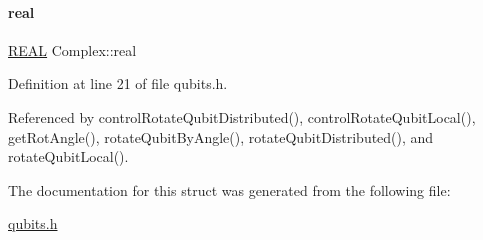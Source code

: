 \mbox{\label{structComplex_a479ad939835457595fcca3ca55c06283}} 
\paragraph{\texorpdfstring{real}{real}}
{\footnotesize\ttfamily \hyperlink{precision_8h_a4b654506f18b8bfd61ad2a29a7e38c25}{R\+E\+AL} Complex\+::real}



Definition at line 21 of file qubits.\+h.



Referenced by control\+Rotate\+Qubit\+Distributed(), control\+Rotate\+Qubit\+Local(), get\+Rot\+Angle(), rotate\+Qubit\+By\+Angle(), rotate\+Qubit\+Distributed(), and rotate\+Qubit\+Local().



The documentation for this struct was generated from the following file\+:\begin{DoxyCompactItemize}
\item 
\hyperlink{qubits_8h}{qubits.\+h}\end{DoxyCompactItemize}
